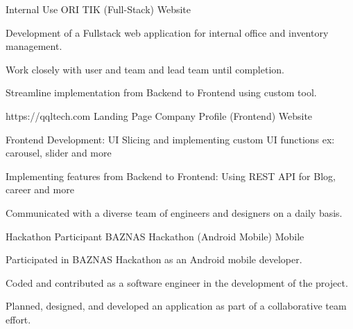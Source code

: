 

\begin{cventries}


\cventry
    {Internal Use} %
    {ORI TIK (Full-Stack)} %
    {Website} %
    {}
    {
      \begin{cvitems} 
        \item {Development of a Fullstack web application for internal office and inventory management.}
        \item {Work closely with user and team and lead team until completion.}
        \item {Streamline implementation from Backend to Frontend using custom tool.}
      \end{cvitems}
    }
    
\cventry
    {https://qqltech.com} %
    {Landing Page Company Profile (Frontend)} %
    {Website} %
    {}
    {
      \begin{cvitems} %
        \item {Frontend Development: UI Slicing and implementing custom UI functions ex: carousel, slider and more}
        \item {Implementing features from Backend to Frontend: Using REST API for Blog, career and more}
        \item {Communicated with a diverse team of engineers and designers on a daily basis.}
      \end{cvitems}
    }
\cventry
    {Hackathon Participant} %
    {BAZNAS Hackathon (Android Mobile)} %
    {Mobile} %
    {}
    {
      \begin{cvitems} %
        \item {Participated in BAZNAS Hackathon as an Android mobile developer.}
        \item {Coded and contributed as a software engineer in the development of the project.}
        \item {Planned, designed, and developed an application as part of a collaborative team effort.}
      \end{cvitems}
    }

    
\end{cventries}
